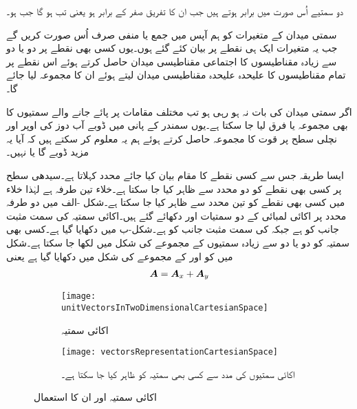 دو سمتیے اُس صورت میں برابر ہوتے ہیں جب ان کا تفریق صفر کے برابر ہو یعنی  تب ہو گا جب  ہو۔

سمتی میدان کے متغیرات کو ہم آپس میں جمع یا منفی صرف اُس صورت کریں گے جب یہ متغیرات ایک ہی نقطے پر بیان کئے گئے ہوں۔یوں کسی بھی نقطے پر دو یا دو سے زیادہ مقناطیسوں کا اجتماعی مقناطیسی میدان حاصل کرتے ہوئے اس نقطے پر تمام مقناطیسوں کا علیحدہ علیحدہ مقناطیسی میدان لیتے ہوئے ان کا مجموعہ لیا جائے گا۔

اگر سمتی میدان کی بات نہ ہو رہی ہو تب مختلف مقامات پر پائے جانے والے سمتیوں کا بھی مجموعہ یا فرق لیا جا سکتا ہے۔یوں سمندر کے پانی میں ڈوبے  آب دوز کی اوپر اور نچلی سطح پر قوت کا مجموعہ حاصل کرتے ہوئے ہم یہ معلوم کر سکتے ہیں کہ آیا یہ مزید ڈوبے گا یا نہیں۔  

ایسا طریقہ جس سے کسی نقطے کا مقام بیان کیا جائے محدد کہلاتا ہے۔سیدھی سطح پر کسی بھی نقطے کو دو محدد سے ظاہر کیا جا سکتا ہے۔خلاء تین طرفہ ہے لہٰذا خلاء میں کسی بھی نقطے کو تین محدد سے ظاہر کیا جا سکتا ہے۔شکل -الف میں دو طرفہ   محدد پر اکائی لمبائی کے دو سمتیات  اور  دکھائے گئے ہیں۔اکائی سمتیہ  کی سمت مثبت  جانب کو ہے جبکہ   کی سمت مثبت  جانب کو ہے۔شکل-ب میں  دکھایا گیا ہے۔کسی بھی سمتیہ کو دو یا دو سے زیادہ سمتیوں کے مجموعے کی شکل میں لکھا جا سکتا ہے۔شکل میں  کو  اور  کے مجموعے کی شکل میں دکھایا گیا ہے یعنی
\begin{align}
{\ensuremath{{\boldsymbol{A}}}}={{\boldsymbol{A}}}_x+{{\boldsymbol{A}}}_y
\end{align}

\begin{figure}
\begin{subfigure}{0.5\textwidth}
\centering
\texttt{[image: unitVectorsInTwoDimensionalCartesianSpace]}
\caption{اکائی سمتیہ}
\end{subfigure}
%
\begin{subfigure}{0.5\textwidth}
\centering
\texttt{[image: vectorsRepresentationCartesianSpace]}
\caption{اکائی سمتیوں کی مدد سے کسی بھی سمتیہ کو ظاہر کیا جا سکتا ہے۔}
\end{subfigure}
\caption{اکائی سمتیہ اور ان کا استعمال}
\label{شکل_سمتیہ_اکائی_سے_سمتیہ_کا_اظہار}
\end{figure}
%


